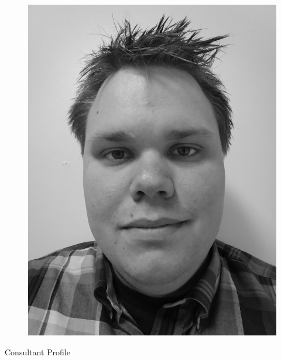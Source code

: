 \documentclass[a4paper,10pt]{article}
\begin{document}
\pagestyle{empty} %

\par{	
    
    \begin{figure}
    \includegraphics[scale=0.04]{Grayscale.pdf}
    \end{figure}
    
    \Huge Consultant Profile
    
	\bigskip
\par}

\end{document}
